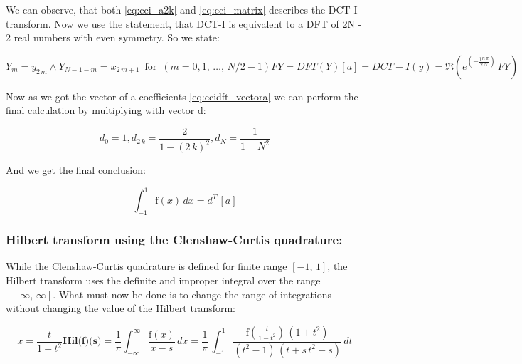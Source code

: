 \documentclass[12pt,twoside,a4paper]{article}
\numberwithin{equation}{subsection}
\numberwithin{figure}{subsection}
\begin{document}
We can observe, that both \ref{eq:cci_a2k} and \ref{eq:cci_matrix} describes the DCT-I transform. Now we use the statement, that
DCT-I is equivalent to a DFT of 2N - 2 real numbers with even symmetry. So we state:

\begin{subequations} \label{eq:cci_dft}
  \begin{equation}   \label{eq:ccidft_ym}
    {Y_{m}}={y_{2\,m}} \wedge {Y_{N - 1 - m}}={x_{2\,m + 1}}\,\mbox{ for }\, (m = 0, 1,\, \ldots,\,N/2-1)  
  \end{equation}
  \begin{equation}   \label{eq:ccidft_fy}
    FY = DFT(Y)
  \end{equation}
  \begin{equation}   \label{eq:ccidft_vectora}
    [a] = DCT-I(y) = \Re (e^{( - \frac {j\,n\,\pi }{2\,N})}\,FY)
  \end{equation}
\end{subequations} 

Now as we got the vector of a coefficients \ref{eq:ccidft_vectora} we can perform the final calculation by multiplying with vector
d:

\begin{equation} \label{eq:cci_vectord}
  {d_{0}} = 1, {d_{2\,k}}=\frac {2}{1 - (2\,k)^{2}}, {d_{N}}=\frac {1}{1 - N^{2}} 
\end{equation} 

And we get the final conclusion:

\begin{equation}
  \int_{ - 1}^{1}\mathrm{f}(x)\,dx=d^{T}\,[a]
\end{equation}

\subsubsection*{Hilbert transform using the Clenshaw-Curtis quadrature:}

While the Clenshaw-Curtis quadrature is defined for finite range $[-1,\,1]$, the Hilbert transform uses the definite and improper
integral over the range $[-\infty,\, \infty]$. What must now be done is to change the range of integrations without changing the
value of the Hilbert transform:

\begin{subequations} \label{eq:cci_range}
  \begin{equation}   \label{eq:ccirange_x}
    x = \frac {t}{1 - t^{2}}
  \end{equation}
  \begin{equation}   \label{eq:ccirange_hil}
    \textbf{Hil(f)(s)} = \frac {1}{\pi } \int_{ - \infty }^{\infty }\frac {\mathrm{f}(x)}{x - s}\,dx = \frac {1}{\pi }\,\int_{ -
    1}^{1}\frac {\mathrm{f}(\frac {t}{1 - t^{2}})\,(1 + t^{2})}{(t^{2} - 1)\,(t + s\,t^{2} - s)}\,dt
  \end{equation}
\end{subequations}
   
\end{document}
